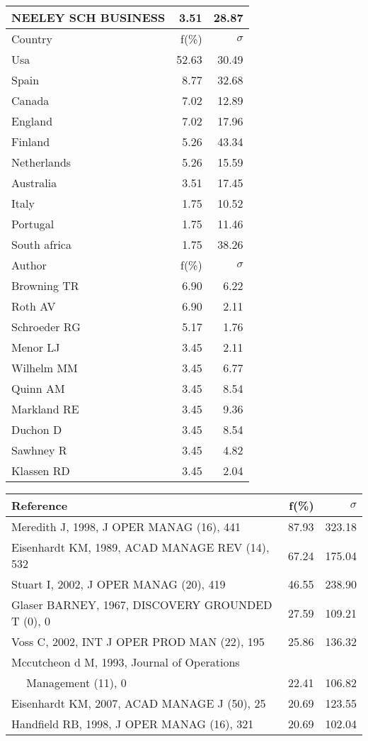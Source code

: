 \documentclass[a4paper,11pt]{report}
\begin{document}
\begin{landscape}
\begin{table}[!ht]
{\begin{tabular}{|l r r|}
NEELEY SCH BUSINESS & 3.51 & 28.87\\
\hline
\hline
Country & f(\%) & $\sigma$\\
\hline
Usa & 52.63 & 30.49\\
Spain & 8.77 & 32.68\\
Canada & 7.02 & 12.89\\
England & 7.02 & 17.96\\
Finland & 5.26 & 43.34\\
Netherlands & 5.26 & 15.59\\
Australia & 3.51 & 17.45\\
Italy & 1.75 & 10.52\\
Portugal & 1.75 & 11.46\\
South africa & 1.75 & 38.26\\
\hline
\hline
Author & f(\%) & $\sigma$\\
\hline
Browning TR & 6.90 & 6.22\\
Roth AV & 6.90 & 2.11\\
Schroeder RG & 5.17 & 1.76\\
Menor LJ & 3.45 & 2.11\\
Wilhelm MM & 3.45 & 6.77\\
Quinn AM & 3.45 & 8.54\\
Markland RE & 3.45 & 9.36\\
Duchon D & 3.45 & 8.54\\
Sawhney R & 3.45 & 4.82\\
Klassen RD & 3.45 & 2.04\\
\hline
\end{tabular}
}
{\scriptsize\begin{tabular}{|l r r|}
\hline
Reference & f(\%) & $\sigma$\\
\hline
Meredith J, 1998, J OPER MANAG (16), 441 & 87.93 & 323.18\\
Eisenhardt KM, 1989, ACAD MANAGE REV (14), 532 & 67.24 & 175.04\\
Stuart I, 2002, J OPER MANAG (20), 419 & 46.55 & 238.90\\
Glaser BARNEY, 1967, DISCOVERY GROUNDED T (0), 0 & 27.59 & 109.21\\
Voss C, 2002, INT J OPER PROD MAN (22), 195 & 25.86 & 136.32\\
Mccutcheon d M, 1993, Journal of Operations &  & \\
$\quad$ Management (11), 0 & 22.41 & 106.82\\
Eisenhardt KM, 2007, ACAD MANAGE J (50), 25 & 20.69 & 123.55\\
Handfield RB, 1998, J OPER MANAG (16), 321 & 20.69 & 102.04\\

\end{tabular}}
\end{table}
\end{landscape}
\end{document}
